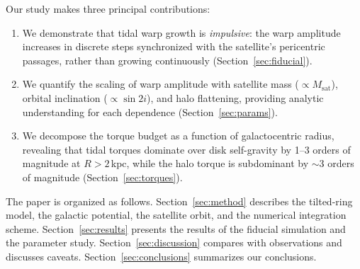 Our study makes three principal contributions:
\begin{enumerate}
    \item We demonstrate that tidal warp growth is \emph{impulsive}: the warp amplitude increases in discrete steps synchronized with the satellite's pericentric passages, rather than growing continuously (Section~\ref{sec:fiducial}).
    \item We quantify the scaling of warp amplitude with satellite mass (${\propto}M_\mathrm{sat}$), orbital inclination (${\propto}\sin 2i$), and halo flattening, providing analytic understanding for each dependence (Section~\ref{sec:params}).
    \item We decompose the torque budget as a function of galactocentric radius, revealing that tidal torques dominate over disk self-gravity by 1--3 orders of magnitude at $R>2$\,kpc, while the halo torque is subdominant by ${\sim}3$ orders of magnitude (Section~\ref{sec:torques}).
\end{enumerate}

The paper is organized as follows. Section~\ref{sec:method} describes the tilted-ring model, the galactic potential, the satellite orbit, and the numerical integration scheme. Section~\ref{sec:results} presents the results of the fiducial simulation and the parameter study. Section~\ref{sec:discussion} compares with observations and discusses caveats. Section~\ref{sec:conclusions} summarizes our conclusions.
